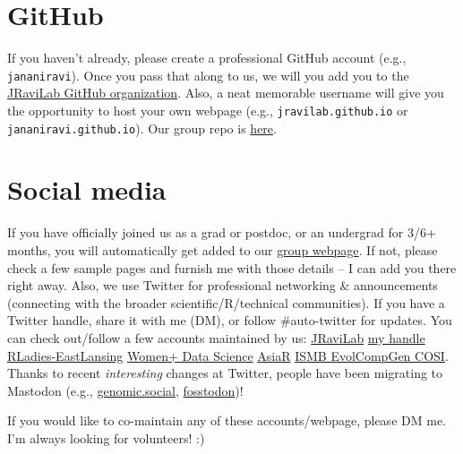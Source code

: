 \documentclass[
  letterpaper,
  DIV=11,
  numbers=noendperiod]{scrreprt}
\begin{document}

\hypertarget{github}{%
\chapter{GitHub}\label{github}}

If you haven't already, please create a professional GitHub account
(e.g., \texttt{jananiravi}). Once you pass that along to us, we will you
add you to the \href{https://github.com/jravilab}{JRaviLab GitHub
organization}. Also, a neat memorable username will give you the
opportunity to host your own webpage (e.g., \texttt{jravilab.github.io}
or \texttt{jananiravi.github.io}). Our group repo is
\href{https://github.com/JRaviLab/group/tree/master/meetings}{here}.


\hypertarget{social-media}{%
\chapter{Social media}\label{social-media}}

If you have officially joined us as a grad or postdoc, or an undergrad
for 3/6+ months, you will automatically get added to our
\href{https://jravilab.github.io/\#people}{group webpage}. If not,
please check a few sample pages and furnish me with those details -- I
can add you there right away. Also, we use Twitter for professional
networking \& announcements (connecting with the broader
scientific/R/technical communities). If you have a Twitter handle, share
it with me (DM), or follow \#auto-twitter for updates. You can check
out/follow a few accounts maintained by us:
\href{https://twitter.com/jravilab}{JRaviLab} \textbar{}
\href{https://twitter.com/janani137}{my handle} \textbar{}
\href{https://twitter.com/rladies-eastlansing}{RLadies-EastLansing}
\textbar{} \href{https://twitter.com/womenplusdata}{Women+ Data Science}
\textbar{} \href{https://twitter.com/AsiaR-comm}{AsiaR} \textbar{}
\href{https://twitter.com/EvolComp}{ISMB EvolCompGen COSI}. Thanks to
recent \emph{interesting} changes at Twitter, people have been migrating
to Mastodon (e.g.,
\href{https://genomic.social/explore}{genomic.social},
\href{https://fosstodon.org/explore}{fosstodon})!

If you would like to co-maintain any of these accounts/webpage, please
DM me. I'm always looking for volunteers! :)

\end{document}
